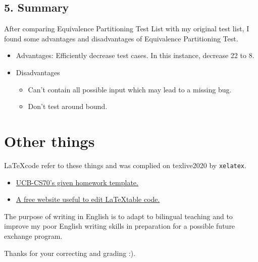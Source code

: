 \documentclass[11pt, oneside]{article}  %
\begin{document}
\subsection*{5. Summary}
After comparing Equivalence Partitioning Test List with my original test list, 
I found some advantages and disadvantages of Equivalence Partitioning Test. 

\begin{itemize}
    \item Advantages: Efficiently decrease test cases. In this instance, decrease 22 to 8. 
    \item Disadvantages
    \begin{itemize}
        \item Can't contain all possible input which may lead to a missing bug. 
        \item Don't test around bound. 
    \end{itemize}
\end{itemize}


\section*{Other things}

    \LaTeX \space code refer to these things and was complied on texlive2020 by \lstinline{xelatex}.
    \begin{itemize}
        \item  \href{https://www.eecs70.org/assets/misc/homework_template.tex}{UCB-CS70's given homework template.} 
        \item  \href{https://www.tablesgenerator.com/}{A free website useful to edit \LaTeX \space table code.}
    \end{itemize}

    The purpose of writing in English is to adapt to bilingual teaching and to improve my poor English 
    writing skills in preparation for a possible future exchange program. 

    Thanks for your correcting and grading :).
\end{document}
